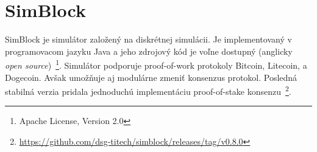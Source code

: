 

\section{SimBlock}

SimBlock je simulátor založený na diskrétnej simulácii. Je implementovaný v programovacom jazyku Java a jeho zdrojový kód je voľne dostupný (anglicky \textit{open source})~\footnote{Apache License, Version 2.0}. Simulátor podporuje proof-of-work protokoly Bitcoin, Litecoin, a Dogecoin. Avšak umožňuje aj modulárne zmeniť konsenzus protokol. Posledná stabilná verzia pridala jednoduchú implementáciu proof-of-stake konsenzu~\footnote{\url{https://github.com/dsg-titech/simblock/releases/tag/v0.8.0}}.

